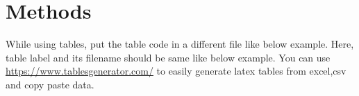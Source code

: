 \section{Methods}
\label{section-methods}

\lipsum[10]


While using tables, put the table code in a different file like below example.
Here, table label and its filename should be same like below example.
You can use \url{https://www.tablesgenerator.com/} to easily generate latex tables from excel,csv and copy paste data.



\lipsum[5]



